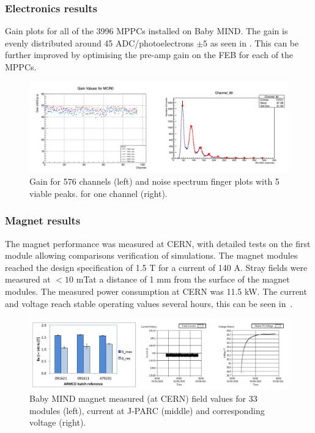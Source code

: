 \subsubsection{Electronics results}

Gain plots for all of the 3996 MPPCs installed on Baby MIND. The gain is evenly distributed around 45 ADC/photoelectrons $\pm  5$ as seen in . This can be further improved by optimising the pre-amp gain on the FEB for each of the MPPCs.

\begin{figure}[h!]
\centering
\includegraphics[width=\textwidth]{figures/mppcplot1.jpeg}
\caption{Gain for 576 channels (left) and noise spectrum finger plots with 5 viable peaks.
 for one channel (right).}
\label{fig:MPPCplot1}
\end{figure}

\subsubsection{Magnet results}

The magnet performance was measured at CERN, with detailed tests on the first module allowing comparisons verification of simulations. The magnet modules reached the design specification of 1.5 T for a current of 140 A. Stray fields were measured at $<10$ mTat a distance of 1 mm from the surface of the magnet modules. The measured power consumption at CERN was 11.5 kW. %
The current and voltage reach stable operating values several hours, this can be seen in~.

\begin{figure}[h!]
\centering
\includegraphics[width=\textwidth]{figures/magnetFigure1.jpeg}
\caption{Baby MIND magnet measured (at CERN) field values for 33 modules (left), current at J-PARC (middle) and corresponding voltage (right).}
\label{fig:Magnetplot1}
\end{figure}



